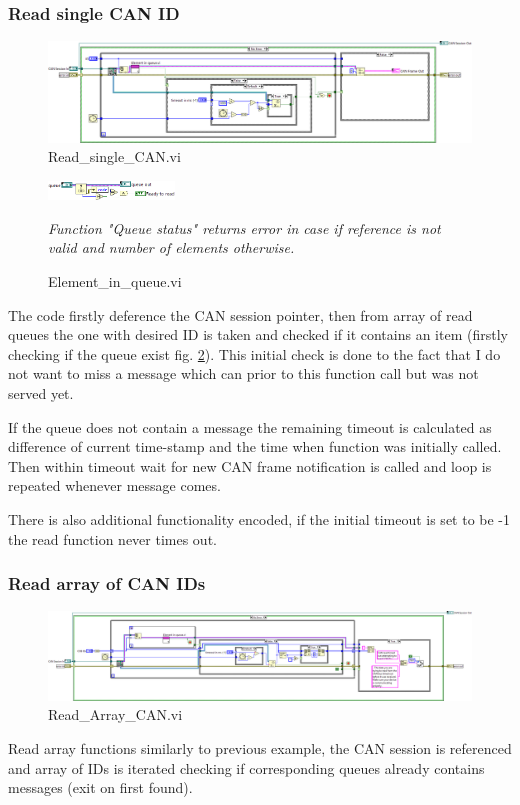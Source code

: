\subsubsection{Read single CAN ID}
\begin{figure}[H]
    \centering
    \includegraphics[scale=\visc,max width=\textwidth]{figures/Read_single_CANd}
    \caption{Read\_single\_CAN.vi}
    \label{vi:Read_single_CAN}
\end{figure}
\begin{figure}
    \centering
    \includegraphics[scale=\visc,max width=0.3\textwidth]{figures/Element_in_queued}
    \caption{Element\_in\_queue.vi}
    \label{vi:Element_in_queue}
    \medskip
    \small
    \textit{Function "Queue status" returns error in case if reference is not valid and number of elements otherwise.}
    \vspace{-15pt}
\end{figure}
The code firstly deference the CAN session pointer, then from array of read queues the one with desired ID is taken and checked if it contains an item (firstly checking if the queue exist fig. \ref{vi:Element_in_queue}). This initial check is done to the fact that I do not want to miss a message which can prior to this function call but was not served yet.

If the queue does not contain a message the remaining timeout is calculated as difference of current time-stamp and the time when function was initially called. Then within timeout wait for new CAN frame notification is called and loop is repeated whenever message comes.

There is also additional functionality encoded, if the initial timeout is set to be -1 the read function never times out.

\subsubsection{Read array of CAN IDs}
\begin{figure}[H]
    \centering
    \includegraphics[scale=\visc,max width=\textwidth]{figures/Read_Array_CANd}
    \caption{Read\_Array\_CAN.vi}
    \label{vi:Read_Array_CAN}
\end{figure}
Read array functions similarly to previous example, the CAN session is referenced and array of IDs is iterated checking if corresponding queues already contains messages (exit on first found).

